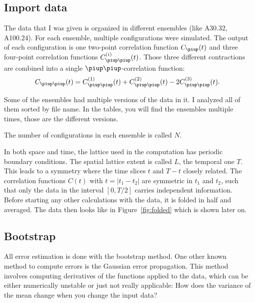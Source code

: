\documentclass[11pt, english, fleqn, DIV=10, headinclude]{scrartcl}
\begin{document}
\subsection{Import data}
\label{sec:import}

The data that I was given is organized in different ensembles (like A30.32,
A100.24). For each ensemble, multiple configurations were simulated. The
output of each configuration is one two-point correlation function $C_\piup(t)$
and three four-point correlation functions $C_{\piup\piup}^{(i)}(t)$. Those
three different contractions are combined into a single
$\piup\piup$-correlation function:
\begin{equation}
    C_{\piup\piup}(t) = C_{\piup\piup}^{(1)}(t) + C_{\piup\piup}^{(2)}(t)
    - 2 C_{\piup\piup}^{(3)}(t).
\end{equation}

Some of the ensembles had multiple versions of the data in it. I analyzed all
of them sorted by file name. In the tables, you will find the ensembles
multiple times, those are the different versions.

The number of configurations in each ensemble is called $N$.

In both space and time, the lattice used in the computation has periodic
boundary conditions. The spatial lattice extent is called $L$, the temporal one
$T$. This leads to a symmetry where the time slices $t$ and $T-t$ closely
related. The correlation functions $C(t)$ with $t = |t_1 - t_2|$ are symmetric
in $t_1$ and $t_2$, such that only the data in the interval $[0, T/2]$ carries
independent information. Before starting any other calculations with the data,
it is folded in half and averaged. The data then looks like in
Figure~\ref{fig:folded} which is shown later on.

\subsection{Bootstrap}
\label{sec:bootstrap}

All error estimation is done with the bootstrap method. One other known method
to compute errors is the Gaussian error propagation. This method involves
computing derivatives of the functions applied to the data, which can be either
numerically unstable or just not really applicable: How does the variance of
the mean change when you change the input data?
\end{document}
